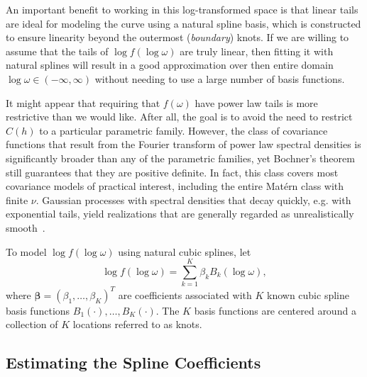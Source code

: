 \documentclass[12pt]{article}
\begin{document}
An important benefit to working in this log-transformed space is that linear tails are ideal for modeling the curve using a natural spline basis, which is constructed to ensure linearity beyond the outermost (\emph{boundary}) knots. If we are willing to assume that the tails of $\log f(\log \omega)$ are truly linear, then fitting it with natural splines will result in a good approximation over then entire domain $\log \omega \in (-\infty, \infty)$ without needing to use a large number of basis functions.

It might appear that requiring that $f(\omega)$ have power law tails is more restrictive than we would like. After all, the goal is to avoid the need to restrict $C(h)$ to a particular parametric family. However, the class of covariance functions that result from the Fourier transform of power law spectral densities is significantly broader than any of the parametric families, yet Bochner's theorem still guarantees that they are positive definite. In fact, this class covers most covariance models of practical interest, including the entire Mat\'ern class with finite $\nu$. Gaussian processes with spectral densities that decay quickly, e.g. with exponential tails, yield realizations that are generally regarded as unrealistically smooth~\cite{Stein1999}. %

To model $\log f(\log \omega)$ using natural cubic splines, let
\begin{equation} \label{eq:spline}
  \log f(\log \omega) = \sum_{k=1}^K \beta_k B_k(\log \omega),
\end{equation}
where $\bm{\beta} = (\beta_1, \dots, \beta_K)^T$ are coefficients associated with $K$ known cubic spline basis functions $B_1(\cdot), \dots, B_K(\cdot)$. The $K$ basis functions are centered around a collection of $K$ locations referred to as knots.



\subsection{Estimating the Spline Coefficients} %
\label{sec:estimating_the_spline_coefficients}
\end{document}
